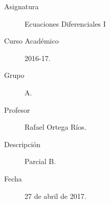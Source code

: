 \documentclass[12pt]{article}
\begin{document}

    
    

    \begin{description}
        \item[Asignatura] Ecuaciones Diferenciales I
        \item[Curso Académico] 2016-17.
        \item[Grupo] A.
        \item[Profesor] Rafael Ortega Ríos.
        \item[Descripción] Parcial B.
        \item[Fecha] 27 de abril de 2017.
    
    \end{description}
    \newpage
\end{document}

